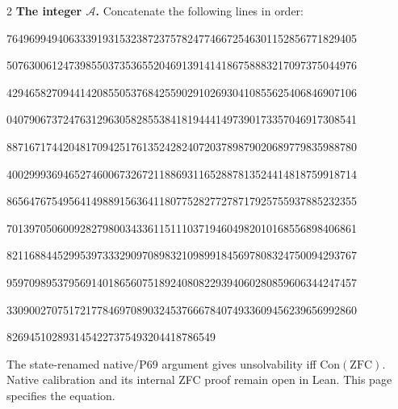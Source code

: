 \documentclass[10pt]{article}
\begin{document}
\begin{multicols}{2}
\textbf{The integer $\mathcal A$.} Concatenate the following lines in order:
\begingroup
\fontsize{8}{9.1}\selectfont{}\par
76496994940633391931532387237578247746672546301152856771829405\par
50763006124739855037353655204691391414186758883217097375044976\par
42946582709441420855053768425590291026930410855625406846907106\par
04079067372476312963058285538418194441497390173357046917308541\par
88716717442048170942517613524282407203789879020689779835988780\par
40029993694652746006732672118869311652887813524414818759918714\par
86564767549564149889156364118077528277278717925755937885232355\par
70139705060092827980034336115111037194604982010168556898406861\par
82116884452995397333290970898321098991845697808324750094293767\par
95970989537956914018656075189240808229394060280859606344247457\par
33090027075172177846970890324537666784074933609456239656992860\par
8269451028931454227375493204418786549\par
\endgroup
\medskip
\normalfont\footnotesize
The state-renamed native/P69 argument gives unsolvability iff
$\mathrm{Con}(\mathrm{ZFC})$. Native calibration and its internal ZFC proof
remain open in Lean. This page specifies the equation.
\end{multicols}
\end{document}
